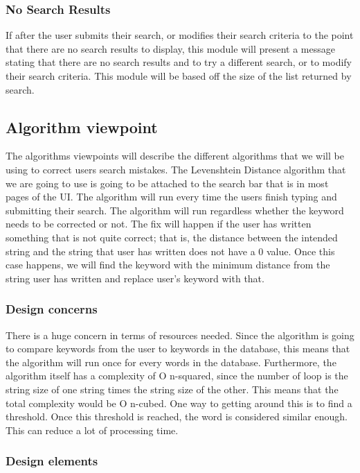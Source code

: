 \documentclass[journal,compsoc, 10pt, draftclsnofoot, onecolumn]{IEEEtran}
\begin{document}
\subsubsection*{No Search Results}
If after the user submits their search, or modifies their search criteria to the
 point that there are no search results to display, this module will present a 
message stating that there are no search results and to try a different search, 
or to modify their search criteria. This module will be based off the size of 
the list returned by search.

\subsection{Algorithm viewpoint}
The algorithms viewpoints will describe the different algorithms that we will be
 using to correct users search mistakes. The Levenshtein Distance algorithm that 
we are going to use is going to be attached to the search bar that is in most 
pages of the UI. The algorithm will run every time the users finish typing and 
submitting their search. The algorithm will run regardless whether the keyword 
needs to be corrected or not. The fix will happen if the user has written 
something that is not quite correct; that is, the distance between the intended 
string and the string that user has written does not have a 0 value. Once this 
case happens, we will find the keyword with the minimum distance from the string 
user has written and replace user's keyword with that.

\subsubsection*{Design concerns}
There is a huge concern in terms of resources needed. Since the algorithm is going to compare keywords from the user to keywords in the database, this means that the algorithm will run once for every words in the database. Furthermore, the algorithm itself has a complexity of O n-squared, since the number of loop is the string size of one string times the string size of the other. This means that the total complexity would be O n-cubed. One way to getting around this is to find a threshold. Once this threshold is reached, the word is considered similar enough. This can reduce a lot of processing time.
\subsubsection*{Design elements}
\end{document}
